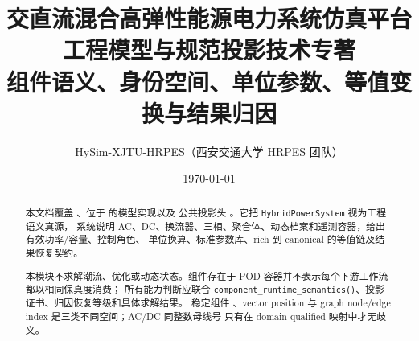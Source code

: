 \documentclass[UTF8,fontset=fandol,a4paper,11pt]{ctexart}
\title{\textbf{交直流混合高弹性能源电力系统仿真平台}\\[0.5em]
       {\Large 工程模型与规范投影技术专著}\\[0.3em]
       {\large 组件语义、身份空间、单位参数、等值变换与结果归因}}
\author{HySim-XJTU-HRPES（西安交通大学 HRPES 团队）}
\date{\today}
\begin{document}
\maketitle
\begin{abstract}
本文档覆盖 、位于  的模型实现以及
公共投影头 。它把 \texttt{HybridPowerSystem} 视为工程语义真源，
系统说明 AC、DC、换流器、三相、聚合体、动态档案和遥测容器，给出有效功率/容量、控制角色、
单位换算、标准参数库、rich 到 canonical 的等值链及结果恢复契约。

本模块不求解潮流、优化或动态状态。组件存在于 POD 容器并不表示每个下游工作流都以相同保真度消费；
所有能力判断应联合 \texttt{component\_runtime\_semantics()}、投影证书、归因恢复等级和具体求解结果。
稳定组件 、vector position 与 graph node/edge index 是三类不同空间；AC/DC 同整数母线号
只有在 domain-qualified 映射中才无歧义。
\end{abstract}

\tableofcontents
\newpage












\end{document}
